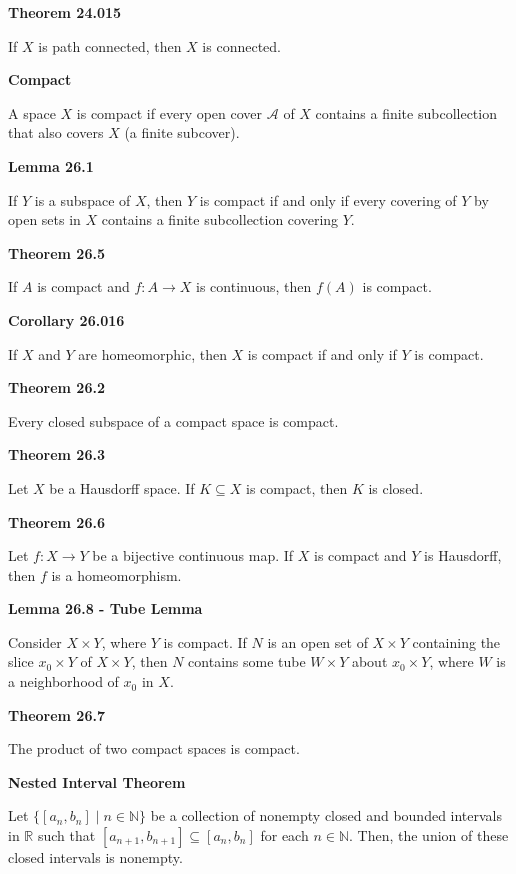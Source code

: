 \documentclass{article}
\begin{document}
\medskip\noindent\textbf{Theorem 24.015}

    If $X$ is path connected, then $X$ is connected.

\medskip\noindent\textbf{Compact}

    A space $X$ is compact if every open cover $\mathcal A$ of $X$ contains a finite subcollection that also covers $X$ (a finite subcover).

\medskip\noindent\textbf{Lemma 26.1}

    If $Y$ is a subspace of $X$, then $Y$ is compact if and only if every covering of $Y$ by open sets in $X$ contains a finite subcollection covering $Y$.

\medskip\noindent\textbf{Theorem 26.5}

    If $A$ is compact and $f: A \to X$ is continuous, then $f(A)$ is compact.

\medskip\noindent\textbf{Corollary 26.016}

    If $X$ and $Y$ are homeomorphic, then $X$ is compact if and only if $Y$ is compact.

\medskip\noindent\textbf{Theorem 26.2}

    Every closed subspace of a compact space is compact.

\medskip\noindent\textbf{Theorem 26.3}

    Let $X$ be a Hausdorff space. If $K \subseteq X$ is compact, then $K$ is closed.

\medskip\noindent\textbf{Theorem 26.6}

    Let $f: X \to Y$ be a bijective continuous map.
    If $X$ is compact and $Y$ is Hausdorff, then $f$ is a homeomorphism.

\medskip\noindent\textbf{Lemma 26.8 - Tube Lemma}

    Consider $X \times Y$, where $Y$ is compact.
    If $N$ is an open set of $X \times Y$ containing the slice $x_0 \times Y$ of $X \times Y$, then $N$ contains some tube $W \times Y$ about $x_0 \times Y$, where $W$ is a neighborhood of $x_0$ in $X$.

\medskip\noindent\textbf{Theorem 26.7}

    The product of two compact spaces is compact.

\medskip\noindent\textbf{Nested Interval Theorem}

    Let $\{[a_n,b_n] \mid n \in \mathbb N\}$ be a collection of nonempty closed and bounded intervals in $\mathbb R$ such that $[a_{n+1},b_{n+1}] \subseteq [a_n, b_n]$ for each $n \in \mathbb N$.
    Then, the union of these closed intervals is nonempty.
\end{document}
